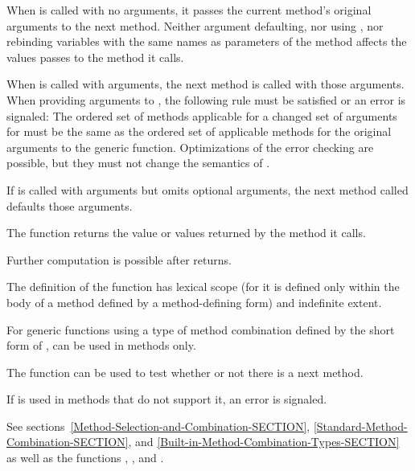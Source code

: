 \begin{defun}[Function]
When  is called with no arguments, it passes the
current method's original arguments to the next method.  Neither
argument defaulting, nor using , nor rebinding variables
with the same names as parameters of the method affects the values
 passes to the method it calls.

When  is called with arguments, the next method
is called with those arguments.  When providing arguments to 
, the following rule must be satisfied or an error is
signaled: The ordered set of methods applicable for a changed set of
arguments for  must be the same as the ordered set of
applicable methods for the original arguments to the generic function.
Optimizations of the error checking are possible, but they must 
not change the semantics of .

If  is called with arguments but omits
optional arguments, the next method called defaults those arguments.



The function  returns the value or values
returned by the method it calls.  


Further computation is possible after  returns.

The definition of the function  has lexical scope (for it
is defined only within the body of a method defined by a method-defining form)
and indefinite extent.

For generic functions using a type of method combination defined by
the short form of , 
 can be used in  methods only.

The function  can be used to test whether or not there is
a next method.

If  is used in methods that do not support it,
an error is signaled.

See sections~\ref{Method-Selection-and-Combination-SECTION},
\ref{Standard-Method-Combination-SECTION}, and
\ref{Built-in-Method-Combination-Types-SECTION} as well as the functions
,
,
and .
\end{defun}


